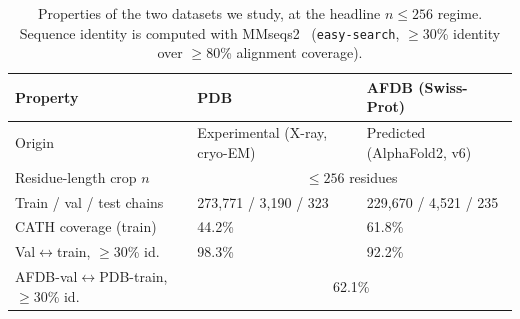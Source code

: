 \begin{table}[tbp]
\centering
\small
\setlength{\tabcolsep}{5pt}
\begin{tabular}{l l l}
\toprule
\textbf{Property} & \textbf{PDB} & \textbf{AFDB (Swiss-Prot)} \\
\midrule
Origin                     & Experimental (X-ray, cryo-EM) & Predicted (AlphaFold2, v6) \\
Residue-length crop $n$    & \multicolumn{2}{c}{$\le 256$ residues} \\
Train / val / test chains  & 273{,}771 / 3{,}190 / 323 & 229{,}670 / 4{,}521 / 235 \\
CATH coverage (train)      & 44.2\% & 61.8\% \\
Val$\leftrightarrow$train, $\ge$30\% id. & 98.3\% & 92.2\% \\
AFDB-val$\leftrightarrow$PDB-train, $\ge$30\% id. & \multicolumn{2}{c}{62.1\%} \\
\bottomrule
\end{tabular}
\caption{Properties of the two datasets we study, at the headline $n{\le}256$ regime.
Sequence identity is computed with MMseqs2~\cite{MMseqs2} (\texttt{easy-search}, $\ge$30\% identity over
$\ge$80\% alignment coverage).}
\label{tab:setup-datasets}
\end{table}
